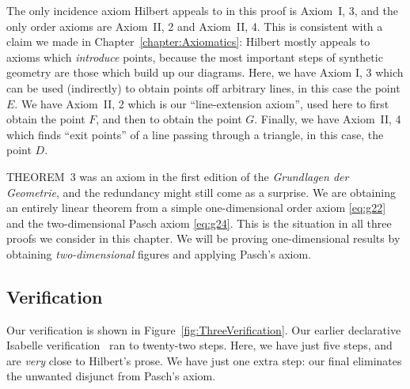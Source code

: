 The only incidence axiom Hilbert appeals to in this proof is Axiom~I, 3, and the only order axioms are Axiom~II, 2 and Axiom~II, 4. This is consistent with a claim we made in Chapter~\ref{chapter:Axiomatics}: Hilbert mostly appeals to axioms which \emph{introduce} points, because the most important steps of synthetic geometry are those which build up our diagrams. Here, we have Axiom I, 3 which can be used (indirectly) to obtain points off arbitrary lines, in this case the point $E$. We have Axiom~II, 2 which is our ``line-extension axiom'', used here to first obtain the point $F$, and then to obtain the point $G$. Finally, we have Axiom~II, 4 which finds ``exit points'' of a line passing through a triangle, in this case, the point $D$.

THEOREM~3 was an axiom in the first edition of the \emph{Grundlagen der Geometrie}, and the redundancy might still come as a surprise. We are obtaining an entirely linear theorem from a simple one-dimensional order axiom \eqref{eq:g22} and the two-dimensional Pasch axiom \eqref{eq:g24}. This is the situation in all three proofs we consider in this chapter. We will be proving one-dimensional results by obtaining \emph{two-dimensional} figures and applying Pasch's axiom.

\subsection{Verification}
Our verification is shown in Figure~\ref{fig:ThreeVerification}. Our earlier declarative Isabelle verification~\cite{ScottMScThesis} ran to twenty-two steps. Here, we have just five steps, and are \emph{very} close to Hilbert's prose. We have just one extra step: our final  eliminates the unwanted disjunct from Pasch's axiom. 


